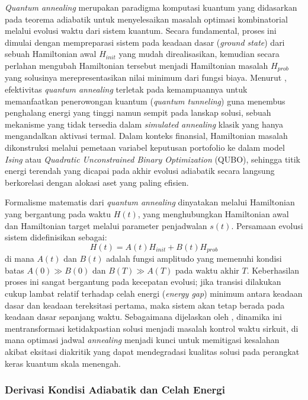 \textit{Quantum annealing} merupakan paradigma komputasi kuantum yang didasarkan pada teorema adiabatik untuk menyelesaikan masalah optimasi kombinatorial melalui evolusi waktu dari sistem kuantum. Secara fundamental, proses ini dimulai dengan mempreparasi sistem pada keadaan dasar (\textit{ground state}) dari sebuah Hamiltonian awal $H_{init}$ yang mudah direalisasikan, kemudian secara perlahan mengubah Hamiltonian tersebut menjadi Hamiltonian masalah $H_{prob}$ yang solusinya merepresentasikan nilai minimum dari fungsi biaya. Menurut \cite{lucas_2014}, efektivitas \textit{quantum annealing} terletak pada kemampuannya untuk memanfaatkan penerowongan kuantum (\textit{quantum tunneling}) guna menembus penghalang energi yang tinggi namun sempit pada lanskap solusi, sebuah mekanisme yang tidak tersedia dalam \textit{simulated annealing} klasik yang hanya mengandalkan aktivasi termal. Dalam konteks finansial, Hamiltonian masalah dikonstruksi melalui pemetaan variabel keputusan portofolio ke dalam model \textit{Ising} atau \textit{Quadratic Unconstrained Binary Optimization} (QUBO), sehingga titik energi terendah yang dicapai pada akhir evolusi adiabatik secara langsung berkorelasi dengan alokasi aset yang paling efisien.

Formalisme matematis dari \textit{quantum annealing} dinyatakan melalui Hamiltonian yang bergantung pada waktu $H(t)$, yang menghubungkan Hamiltonian awal dan Hamiltonian target melalui parameter penjadwalan $s(t)$. Persamaan evolusi sistem didefinisikan sebagai:
\begin{equation}
    H(t) = A(t)H_{init} + B(t)H_{prob}
\end{equation}
di mana $A(t)$ dan $B(t)$ adalah fungsi amplitudo yang memenuhi kondisi batas $A(0) \gg B(0)$ dan $B(T) \gg A(T)$ pada waktu akhir $T$. Keberhasilan proses ini sangat bergantung pada kecepatan evolusi; jika transisi dilakukan cukup lambat relatif terhadap celah energi (\textit{energy gap}) minimum antara keadaan dasar dan keadaan tereksitasi pertama, maka sistem akan tetap berada pada keadaan dasar sepanjang waktu. Sebagaimana dijelaskan oleh \cite{preskill_2018}, dinamika ini mentransformasi ketidakpastian solusi menjadi masalah kontrol waktu sirkuit, di mana optimasi jadwal \textit{annealing} menjadi kunci untuk memitigasi kesalahan akibat eksitasi diakritik yang dapat mendegradasi kualitas solusi pada perangkat keras kuantum skala menengah.

\subsubsection{Derivasi Kondisi Adiabatik dan Celah Energi}

